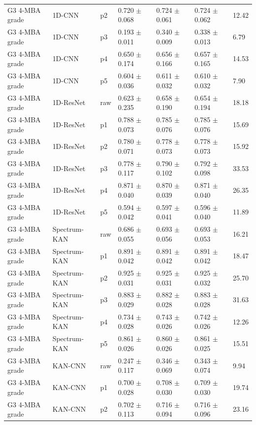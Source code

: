 {\begin{longtable}{L{2.35cm}L{2.4cm}L{1.0cm}L{2.35cm}L{2.25cm}L{2.25cm}L{1.45cm}}
G3 4-MBA grade & 1D-CNN & p2 & 0.720 $\pm$ 0.068 & 0.724 $\pm$ 0.061 & 0.724 $\pm$ 0.062 & 12.42 \\
G3 4-MBA grade & 1D-CNN & p3 & 0.193 $\pm$ 0.011 & 0.340 $\pm$ 0.009 & 0.338 $\pm$ 0.013 & 6.79 \\
G3 4-MBA grade & 1D-CNN & p4 & 0.650 $\pm$ 0.174 & 0.656 $\pm$ 0.166 & 0.657 $\pm$ 0.165 & 14.53 \\
G3 4-MBA grade & 1D-CNN & p5 & 0.604 $\pm$ 0.036 & 0.611 $\pm$ 0.032 & 0.610 $\pm$ 0.032 & 7.90 \\
G3 4-MBA grade & 1D-ResNet & raw & 0.623 $\pm$ 0.235 & 0.658 $\pm$ 0.190 & 0.654 $\pm$ 0.194 & 18.18 \\
G3 4-MBA grade & 1D-ResNet & p1 & 0.788 $\pm$ 0.073 & 0.785 $\pm$ 0.076 & 0.785 $\pm$ 0.076 & 15.69 \\
G3 4-MBA grade & 1D-ResNet & p2 & 0.780 $\pm$ 0.071 & 0.778 $\pm$ 0.073 & 0.778 $\pm$ 0.073 & 15.92 \\
G3 4-MBA grade & 1D-ResNet & p3 & 0.778 $\pm$ 0.117 & 0.790 $\pm$ 0.102 & 0.792 $\pm$ 0.098 & 33.53 \\
G3 4-MBA grade & 1D-ResNet & p4 & 0.871 $\pm$ 0.040 & 0.870 $\pm$ 0.039 & 0.871 $\pm$ 0.040 & 26.35 \\
G3 4-MBA grade & 1D-ResNet & p5 & 0.594 $\pm$ 0.042 & 0.597 $\pm$ 0.041 & 0.596 $\pm$ 0.040 & 11.89 \\
G3 4-MBA grade & Spectrum-KAN & raw & 0.686 $\pm$ 0.055 & 0.693 $\pm$ 0.056 & 0.693 $\pm$ 0.053 & 16.21 \\
G3 4-MBA grade & Spectrum-KAN & p1 & 0.891 $\pm$ 0.042 & 0.891 $\pm$ 0.042 & 0.891 $\pm$ 0.042 & 18.47 \\
G3 4-MBA grade & Spectrum-KAN & p2 & 0.925 $\pm$ 0.031 & 0.925 $\pm$ 0.031 & 0.925 $\pm$ 0.032 & 25.70 \\
G3 4-MBA grade & Spectrum-KAN & p3 & 0.883 $\pm$ 0.029 & 0.882 $\pm$ 0.028 & 0.883 $\pm$ 0.028 & 31.63 \\
G3 4-MBA grade & Spectrum-KAN & p4 & 0.734 $\pm$ 0.028 & 0.743 $\pm$ 0.026 & 0.742 $\pm$ 0.026 & 12.26 \\
G3 4-MBA grade & Spectrum-KAN & p5 & 0.861 $\pm$ 0.026 & 0.860 $\pm$ 0.026 & 0.861 $\pm$ 0.025 & 15.51 \\
G3 4-MBA grade & KAN-CNN & raw & 0.247 $\pm$ 0.117 & 0.346 $\pm$ 0.069 & 0.343 $\pm$ 0.074 & 9.94 \\
G3 4-MBA grade & KAN-CNN & p1 & 0.700 $\pm$ 0.028 & 0.708 $\pm$ 0.030 & 0.709 $\pm$ 0.030 & 19.74 \\
G3 4-MBA grade & KAN-CNN & p2 & 0.702 $\pm$ 0.113 & 0.716 $\pm$ 0.094 & 0.716 $\pm$ 0.096 & 23.16 \\

\end{longtable}}
